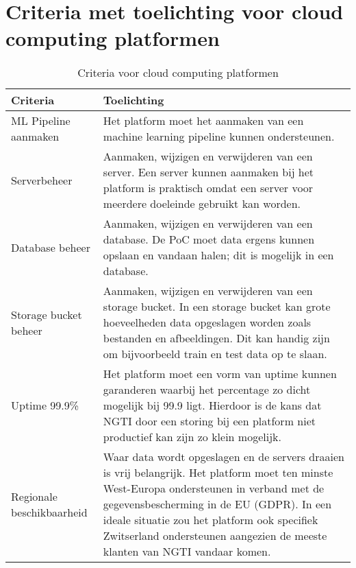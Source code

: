 \section*{Criteria met toelichting voor cloud computing platformen}\label{appendix:criteria-with-elaboration-for-cloud-computing-platforms}

\begin{table}[hbt!]
  \centering
  \caption{Criteria voor cloud computing platformen}
  \begin{tabular}{|p{.2\linewidth}|p{.69\linewidth}|}
  \hline
  \textbf{Criteria} & \textbf{Toelichting} \\ \hline
    ML Pipeline \newline aanmaken
    &
    Het platform moet het aanmaken van een machine learning pipeline kunnen ondersteunen. 
    \\ \hline

    Serverbeheer
    &
    Aanmaken, wijzigen en verwijderen van een server. Een server kunnen aanmaken bij het platform is praktisch omdat een server voor meerdere doeleinde gebruikt kan worden.
    \\ \hline

    Database beheer
    &
    Aanmaken, wijzigen en verwijderen van een database. De PoC moet data ergens kunnen opslaan en vandaan halen; dit is mogelijk in een database.
    \\ \hline

    Storage \newline bucket beheer
    &
    Aanmaken, wijzigen en verwijderen van een storage bucket. In een storage bucket kan grote hoeveelheden data opgeslagen worden zoals bestanden en afbeeldingen. Dit kan handig zijn om bijvoorbeeld train en test data op te slaan.
    \\ \hline

    Uptime 99.9\%
    &
    Het platform moet een vorm van uptime kunnen garanderen waarbij het percentage zo dicht mogelijk bij 99.9 ligt. Hierdoor is de kans dat NGTI door een storing bij een platform niet productief kan zijn zo klein mogelijk.
    \\ \hline

    Regionale \newline beschikbaarheid
    &
    Waar data wordt opgeslagen en de servers draaien is vrij belangrijk. Het platform moet ten minste West-Europa ondersteunen in verband met de gegevensbescherming in de EU (GDPR). In een ideale situatie zou het platform ook specifiek Zwitserland ondersteunen aangezien de meeste klanten van NGTI vandaar komen.
    \\ \hline


\end{tabular}
\end{table}
